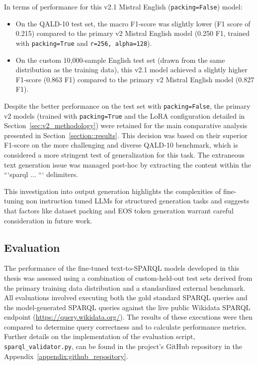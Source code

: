 In terms of performance for this v2.1 Mistral English (\texttt{packing=False}) model:
\begin{itemize}
    \item On the QALD-10 test set, the macro F1-score was slightly lower (F1 score of 0.215) compared to the primary v2 Mistral English model (0.250 F1, trained with \texttt{packing=True} and \texttt{r=256, alpha=128}).
    \item On the custom 10,000-sample English test set (drawn from the same distribution as the training data), this v2.1 model achieved a slightly higher F1-score (0.863 F1) compared to the primary v2 Mistral English model (0.827 F1).
\end{itemize}
Despite the better performance on the test set with \texttt{packing=False}, the primary v2 models (trained with \texttt{packing=True} and the LoRA configuration detailed in Section~\ref{sec:v2_methodology}) were retained for the main comparative analysis presented in Section~\ref{section::results}. 
This decision was based on their superior F1-score on the more challenging and diverse QALD-10 benchmark, which is considered a more stringent test of generalization for this task. 
The extraneous text generation issue was managed post-hoc by extracting the content within the ```sparql ... ``` delimiters.

This investigation into output generation highlights the complexities of fine-tuning non instruction tuned LLMs for structured generation tasks and suggests that factors like dataset packing and EOS token generation warrant careful consideration in future work.

\subsection{Evaluation}

The performance of the fine-tuned text-to-SPARQL models developed in this thesis was assessed using a combination of custom-held-out test sets derived from the primary training data distribution and a standardized external benchmark.
All evaluations involved executing both the gold standard SPARQL queries and the model-generated SPARQL queries against the live public Wikidata SPARQL endpoint (\url{https://query.wikidata.org/}).
The results of these executions were then compared to determine query correctness and to calculate performance metrics.
Further details on the implementation of the evaluation script, \texttt{sparql\_validator.py}, can be found in the project's GitHub repository in the Appendix~\ref{appendix:github_repository}.

